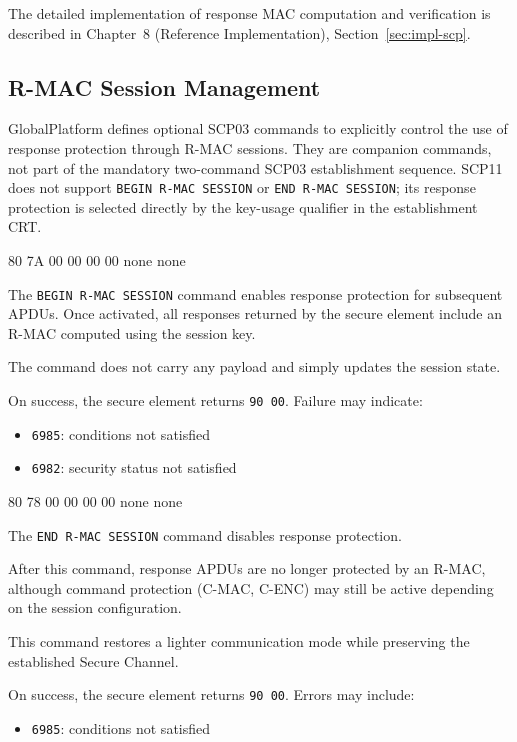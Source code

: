 The detailed implementation of response MAC computation and verification is
described in Chapter~8 (Reference Implementation), Section~\ref{sec:impl-scp}.

\subsection{R-MAC Session Management}
\label{sec:rmac-session-management}

GlobalPlatform defines optional SCP03 commands to explicitly control the use
of response protection through R-MAC sessions. They are companion commands,
not part of the mandatory two-command SCP03 establishment sequence. SCP11 does
not support \texttt{BEGIN R-MAC SESSION} or \texttt{END R-MAC SESSION};
its response protection is selected directly by the key-usage qualifier in
the establishment CRT.

\apdudesc
{80}
{7A}
{00}
{00}
{00}
{00}
{none}
{none}

The \texttt{BEGIN R-MAC SESSION} command enables response protection for
subsequent APDUs.  Once activated, all responses returned by the secure element include
an R-MAC computed using the session key.

The command does not carry any payload and simply updates the session state.

On success, the secure element returns \texttt{90 00}. Failure may indicate:
\begin{itemize}
\item \texttt{6985}: conditions not satisfied
\item \texttt{6982}: security status not satisfied
\end{itemize}

\apdudesc
{80}
{78}
{00}
{00}
{00}
{00}
{none}
{none}

The \texttt{END R-MAC SESSION} command disables response protection.

After this command, response APDUs are no longer protected by an R-MAC,
although command protection (C-MAC, C-ENC) may still be active depending on the
session configuration.

This command restores a lighter communication mode while preserving the
established Secure Channel.

On success, the secure element returns \texttt{90 00}. Errors may include:
\begin{itemize}
\item \texttt{6985}: conditions not satisfied
\end{itemize}

